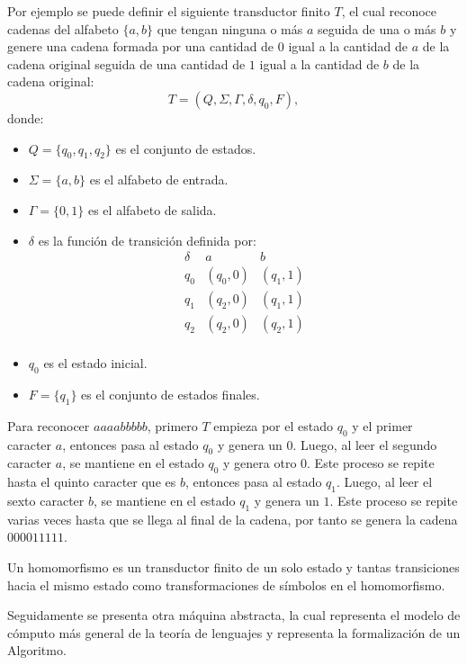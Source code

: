 Por ejemplo se puede definir el siguiente transductor finito $T$, el cual reconoce cadenas del alfabeto $\{a,b\}$
que tengan ninguna o más $a$ seguida de una o más $b$ y genere una cadena formada por una cantidad de $0$ igual
a la cantidad de $a$ de la cadena original seguida de una cantidad de $1$ igual a la cantidad de $b$ de
la cadena original:
\[
  T = (Q, \Sigma, \Gamma, \delta, q_0, F),
\]
donde:
\begin{itemize}
  \item \(Q = \{q_0, q_1, q_2\}\) es el conjunto de estados.
  \item \(\Sigma = \{a, b\}\) es el alfabeto de entrada.
  \item \(\Gamma = \{0, 1\}\) es el alfabeto de salida.
  \item \(\delta\) es la función de transición definida por:
        \[
          \begin{array}{c|c|c}
            \delta & a        & b        \\
            \hline
            q_0    & (q_0, 0) & (q_1, 1) \\
            q_1    & (q_2, 0) & (q_1, 1) \\
            q_2    & (q_2, 0) & (q_2, 1) \\
          \end{array}
        \]
  \item \(q_0\) es el estado inicial.
  \item \(F = \{q_1\}\) es el conjunto de estados finales.
\end{itemize}

Para reconocer $aaaabbbbb$, primero $T$ empieza por el estado $q_0$ y el primer caracter $a$, entonces pasa al estado $q_0$ y genera un $0$.
Luego, al leer el segundo caracter $a$, se mantiene en el estado $q_0$ y genera otro $0$. Este proceso se repite hasta el quinto caracter
que es $b$, entonces pasa al estado $q_1$. Luego, al leer el sexto caracter $b$, se mantiene en el estado $q_1$ y genera un $1$. Este proceso
se repite varias veces hasta que se llega al final de la cadena, por tanto se genera la cadena $000011111$.

Un homomorfismo es un transductor finito de un solo estado y tantas transiciones hacia el mismo estado como transformaciones de símbolos en el homomorfismo.

Seguidamente se presenta otra máquina abstracta, la cual representa el modelo de cómputo más general de la teoría de lenguajes y 
representa la formalización de un Algoritmo.


